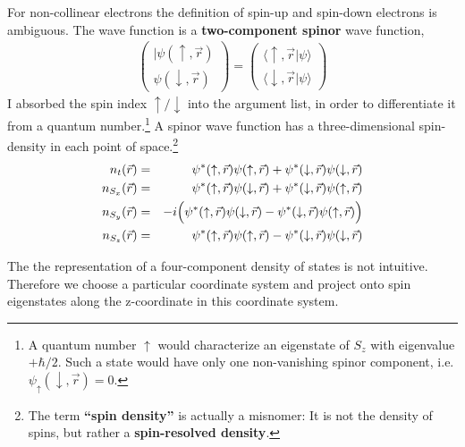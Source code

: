 \documentclass[final,12pt]{article}
\begin{document}
{{{{{{For non-collinear electrons the definition of spin-up and spin-down
electrons is ambiguous. The wave function is a \textbf{two-component
  spinor} wave function,
\begin{eqnarray}
\left(\begin{array}{c}|\psi(\uparrow,\vec{r})\\\psi(\downarrow,\vec{r})
\end{array}\right)
=\left(\begin{array}{c}\langle\uparrow,\vec{r}|\psi\rangle\\
\langle\downarrow,\vec{r}|\psi\rangle
\end{array}\right)
\end{eqnarray}
I absorbed the spin index $\uparrow/\downarrow$ into the argument
list, in order to differentiate it from a quantum number.\footnote{A
  quantum number $\uparrow$ would characterize an eigenstate of $S_z$
  with eigenvalue $+\hbar/2$. Such a state would have only one
  non-vanishing spinor component,
  i.e. $\psi_\uparrow(\downarrow,\vec{r})=0$.}  A spinor wave function
has a three-dimensional spin-density in each point of
space.\footnote{The term \textbf{``spin density''}
  is actually a misnomer: It is not the density of spins, but rather a
  \textbf{spin-resolved density}.}
\begin{eqnarray}
n_t(\vec{r})
&=&
\psi^*(\uparrow,\vec{r})\psi(\uparrow,\vec{r})  
+\psi^*(\downarrow,\vec{r})\psi(\downarrow,\vec{r})  
\nonumber\\
n_{S_x}(\vec{r})
&=&
\psi^*(\uparrow,\vec{r})\psi(\downarrow,\vec{r})  
+\psi^*(\downarrow,\vec{r})\psi(\uparrow,\vec{r})  
\nonumber\\
n_{S_y}(\vec{r})
&=&
-i\Bigl(
\psi^*(\uparrow,\vec{r})\psi(\downarrow,\vec{r})  
-\psi^*(\downarrow,\vec{r})\psi(\uparrow,\vec{r})  
\Bigr)
\nonumber\\
n_{S_z}(\vec{r})
&=&
\psi^*(\uparrow,\vec{r})\psi(\uparrow,\vec{r})  
-\psi^*(\downarrow,\vec{r})\psi(\downarrow,\vec{r})  
\nonumber\\
\end{eqnarray}

The the representation of a four-component density of states is not
intuitive. Therefore we choose a particular coordinate system and
project onto spin eigenstates along the z-coordinate in this
coordinate system.

}}}}}}
\end{document}
